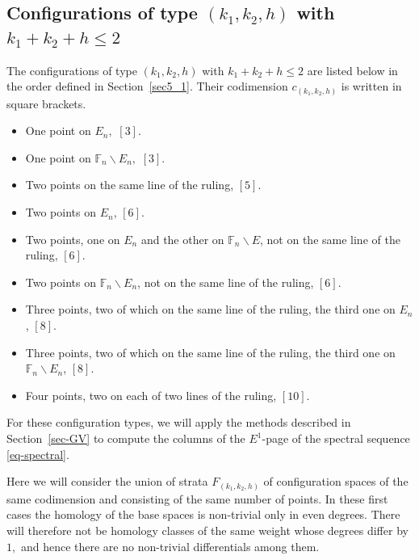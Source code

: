 \documentclass[10pt,a4paper,twoside]{amsart}
\theoremstyle{plain}
\theoremstyle{definition}
\theoremstyle{remark}
\begin{document}
\subsection{Configurations of type $(k_1,k_2,h)$ with $k_1+k_2+h\leq2$} \label{sec-config1}

The configurations of type $(k_1,k_2,h)$ with $k_1+k_2+h\leq2$ 
are listed below in the order defined in Section~\ref{sec5_1}. 
Their codimension $c_{(k_1,k_2,h)}$ is written in square brackets.

\begin{itemize}
\item[$(1,0,0):$] One point on $E_n,$ $\left[3\right]$.
\item[$(0,1,0):$] One point on $\mathbb{F}_n\backslash E_n,$ $\left[3\right]$.
\item[$(0,0,1):$] Two points on the same line of the ruling, $\left[5\right]$.
\item[$(2,0,0):$] Two points on $E_n$, $\left[6\right]$.
\item[$(1,1,0):$] Two points, one on $E_n$ and the other on $\mathbb{F}_n\backslash E$, not on the same line of the ruling, $\left[6\right]$.
\item[$(0,2,0):$] Two points on $\mathbb{F}_n\backslash E_n$, not on the same line of the ruling, $\left[6\right]$.
\item[$(1,0,1):$] Three points, two of which on the same line of the ruling, the third one on $E_n$, $\left[8\right]$.
\item[$(0,1,1):$] Three points, two of which on the same line of the ruling, the third one on $\mathbb{F}_n\backslash E_n$, $\left[8\right]$.
\item[$(0,0,2):$] Four points, two on each of two lines of the ruling, $\left[10\right]$.
\end{itemize}

For these configuration types, we will apply the methods described in Section~\ref{sec-GV} to compute the columns of the $E^1$-page of the spectral sequence \eqref{eq-spectral}.

Here we will consider the union of strata $F_{(k_1,k_2,h)}$ of configuration spaces of the same codimension and consisting of the same number of points. In these first cases the homology of the base spaces is non-trivial only in even degrees. There will therefore not be homology classes of the same weight whose degrees differ by $1,$ and hence there are no non-trivial differentials among them.
\end{document}
